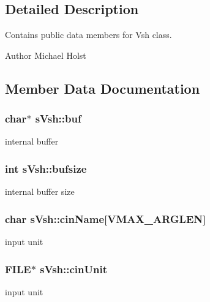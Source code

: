 \subsection{Detailed Description}
Contains public data members for Vsh class. 

\begin{DoxyAuthor}{Author}
Michael Holst 
\end{DoxyAuthor}


\subsection{Member Data Documentation}
\subsubsection[{buf}]{\setlength{\rightskip}{0pt plus 5cm}char$\ast$ s\-Vsh\-::buf}\label{a00007_a54d6581a859ce3e568994a2acb34eeca}


internal buffer 

\subsubsection[{bufsize}]{\setlength{\rightskip}{0pt plus 5cm}int s\-Vsh\-::bufsize}\label{a00007_a3178ea2c169d30c7de2db923c6fc1472}


internal buffer size 

\subsubsection[{cin\-Name}]{\setlength{\rightskip}{0pt plus 5cm}char s\-Vsh\-::cin\-Name[{\bf V\-M\-A\-X\-\_\-\-A\-R\-G\-L\-E\-N}]}\label{a00007_a4f656d4cfedad44dfa387f941aaf1f70}


input unit 

\subsubsection[{cin\-Unit}]{\setlength{\rightskip}{0pt plus 5cm}F\-I\-L\-E$\ast$ s\-Vsh\-::cin\-Unit}\label{a00007_aafb169c1a906339713936d6434f1aab2}


input unit 

